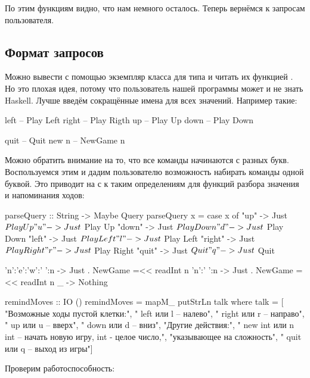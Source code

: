 По этим функциям видно, что нам немного осталось.
Теперь вернёмся к запросам пользователя.

\subsection{Формат запросов}

Можно вывести с помощью  экземпляр
класса  для типа  и читать их 
функцией . Но это плохая идея, потому что
пользователь нашей программы может и не знать Haskell.
Лучше введём сокращённые имена для всех значений.
Например такие:

\begin{code}
left        -- Play Left
right       -- Play Rigth
up          -- Play Up
down        -- Play Down

quit        -- Quit
new n       -- NewGame n
\end{code}

Можно обратить внимание на то, что все команды
начинаются с разных букв. Воспользуемся этим и
дадим пользователю возможность набирать команды одной буквой.
Это приводит на с к таким определениям для функций
разбора значения и напоминания ходов:

\begin{code}
parseQuery :: String -> Maybe Query
parseQuery x = case x of
    "up"    -> Just $ Play Up
    "u"     -> Just $ Play Up
    "down"  -> Just $ Play Down 
    "d"     -> Just $ Play Down 
    "left"  -> Just $ Play Left
    "l"     -> Just $ Play Left
    "right" -> Just $ Play Right
    "r"     -> Just $ Play Right
    "quit"  -> Just $ Quit
    "q"     -> Just $ Quit

    'n':'e':'w':' ':n   -> Just . NewGame =<< readInt n
    'n':' ':n           -> Just . NewGame =<< readInt n  
    _       -> Nothing

remindMoves :: IO ()
remindMoves = mapM_ putStrLn talk
    where talk = [
            "Возможные ходы пустой клетки:",
            "   left     или l       -- налево",
            "   right    или r       -- направо",
            "   up       или u       -- вверх",
            "   down     или d       -- вниз",
            "Другие действия:",
            "   new int  или n int -- начать новую игру, int - целое число,", 
                                      "указывающее на сложность",
            "   quit     или q      -- выход из игры"]
\end{code}


Проверим работоспособность: 

